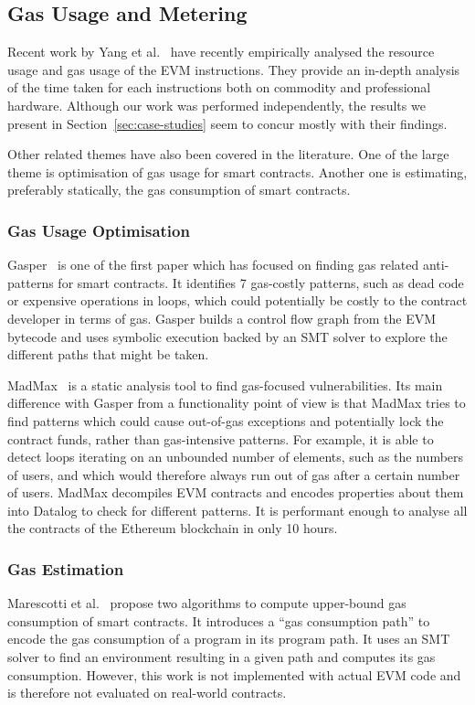 \subsection{Gas Usage and Metering}
Recent work by Yang et al.~\cite{DBLP:journals/corr/abs-1905-00553} have recently empirically analysed the resource usage and gas usage of the EVM instructions. They provide an in-depth analysis of the time taken for each instructions both on commodity and professional hardware. Although our work was performed independently, the results we present in Section~\ref{sec:case-studies} seem to concur mostly with their findings.

Other related themes have also been covered in the literature. One of the large theme is optimisation of gas usage for smart contracts. Another one is estimating, preferably statically, the gas consumption of smart contracts.

\subsubsection*{Gas Usage Optimisation}
Gasper~\cite{Chen2017} is one of the first paper which has focused on finding gas related anti-patterns for smart contracts. It identifies 7 gas-costly patterns, such as dead code or expensive operations in loops, which could potentially be costly to the contract developer in terms of gas. Gasper builds a control flow graph from the EVM bytecode and uses symbolic execution backed by an SMT solver to explore the different paths that might be taken.

MadMax~\cite{Grech2018} is a static analysis tool to find gas-focused vulnerabilities. Its main difference with Gasper from a functionality point of view is that MadMax tries to find patterns which could cause out-of-gas exceptions and potentially lock the contract funds, rather than gas-intensive patterns. For example, it is able to detect loops iterating on an unbounded number of elements, such as the numbers of users, and which would therefore always run out of gas after a certain number of users. MadMax decompiles EVM contracts and encodes properties about them into Datalog to check for different patterns. It is performant enough to analyse all the contracts of the Ethereum blockchain in only 10 hours.

\subsubsection*{Gas Estimation}
Marescotti et al.~\cite{10.1007/978-3-030-03427-6_33} propose two algorithms to compute upper-bound gas consumption of smart contracts. It introduces a ``gas consumption path'' to encode the gas consumption of a program in its program path. It uses an SMT solver to find an environment resulting in a given path and computes its gas consumption. However, this work is not implemented with actual EVM code and is therefore not evaluated on real-world contracts.


